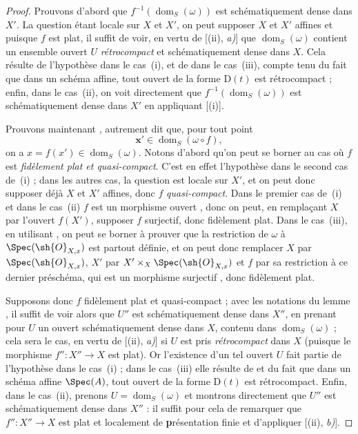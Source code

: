 \begin{proof}
Prouvons d'abord que $f^{-1}(\operatorname{dom}_S(\omega))$ est schématiquement dense dans $X'$.
La question étant locale sur $X$ et $X'$, on peut supposer $X$ et $X'$ affines et puisque $f$ est plat, il suffit de voir, en vertu de [(ii), \emph{a)}] que $\operatorname{dom}_S(\omega)$ contient un ensemble ouvert $U$ \emph{rétrocompact} et schématiquement dense dans $X$.
Cela résulte de l'hypothèse dans le cas~(i), et de  dans le cas~(iii), compte tenu du fait que dans un schéma affine, tout ouvert de la forme $\mathrm{D}(t)$ est rétrocompact ; enfin, dans le cas~(ii), on voit directement que $f^{-1}(\operatorname{dom}_S(\omega))$ est schématiquement dense dans $X'$ en appliquant [(i)].

Prouvons maintenant , autrement dit que, pour tout point
\[
  \boldsymbol{x}'\in\operatorname{dom}_S(\omega\circ f),
\]
on a $x=f(x')\in\operatorname{dom}_S(\omega)$.
Notons d'abord qu'on peut se borner au cas où $f$ est \emph{fidèlement plat et quasi-compact}.
C'est en effet l'hypothèse dans le second cas de~(i) ; dans les autres cas, la question est locale sur $X'$, et on peut donc supposer déjà $X$ et $X'$ affines, donc $f$ \emph{quasi-compact}.
Dans le premier cas de~(i) et dans le cas~(ii) $f$ est un morphisme ouvert , donc on peut, en remplaçant $X$ par l'ouvert $f(X')$, supposer $f$ surjectif, donc fidèlement plat.
Dans le cas~(iii), en utilisant , on peut se borner à prouver que la restriction de $\omega$ à $\Spec(\sh{O}_{X,x})$ est partout définie, et on peut donc remplacer $X$ par $\Spec(\sh{O}_{X,x})$, $X'$ par $X'\times_X\Spec(\sh{O}_{X,x})$ et $f$ par sa restriction à ce dernier préschéma, qui est un morphisme surjectif , donc fidèlement plat.

Supposons donc $f$ fidèlement plat et quasi-compact ; avec les notations du lemme , il suffit de voir alors que $U''$ est schématiquement dense dans $X''$, en prenant pour $U$ un ouvert schématiquement dense dans $X$, contenu dans $\operatorname{dom}_S(\omega)$ ; cela sera le cas, en vertu de [(ii), \emph{a)}] si $U$ est pris \emph{rétrocompact} dans $X$ (puisque le morphisme $f'':X''\to X$ est plat).
Or l'existence d'un tel ouvert $U$ fait partie de l'hypothèse dans le cas~(i) ; dans le cas~(iii) elle résulte de  et du fait que dans un schéma affine $\Spec(A)$, tout ouvert de la forme $\mathrm{D}(t)$ est rétrocompact.
Enfin, dans le cas~(ii), prenons $U=\operatorname{dom}_S(\omega)$ et montrons directement que $U''$ est schématiquement dense dans $X''$ : il suffit pour cela de remarquer que $f'':X''\to X$ est plat et localement de \textbf{p}résentation finie et d'appliquer [(ii), \emph{b)}].
\end{proof}


